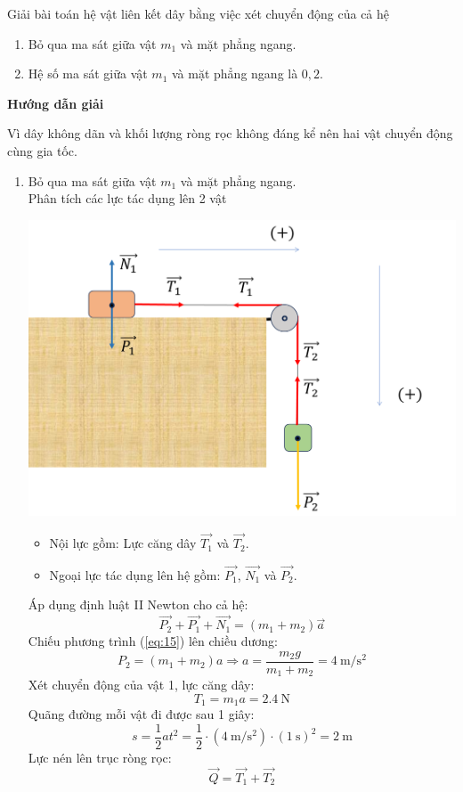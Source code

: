 \begin{dang}{Giải bài toán hệ vật liên kết dây bằng việc xét chuyển động của cả hệ}
{\begin{enumerate}[label=\alph*)]
		\item Bỏ qua ma sát giữa vật $m_1$ và mặt phẳng ngang.
		\item Hệ số ma sát giữa vật $m_1$ và mặt phẳng ngang là $0,2$.
	\end{enumerate}
}
{\begin{center}
		\textbf{Hướng dẫn giải}
	\end{center}
Vì dây không dãn và khối lượng ròng rọc không đáng kể nên hai vật chuyển động cùng gia tốc.
	\begin{enumerate}[label=\alph*)]
		\item Bỏ qua ma sát giữa vật $m_1$ và mặt phẳng ngang.\\
		Phân tích các lực tác dụng lên 2 vật
		\begin{center}
			\includegraphics[width=0.6\linewidth]{../figs/VN10-2023-PH-TP021-2}
		\end{center}
		\begin{itemize}
			\item Nội lực gồm: Lực căng dây $\overrightarrow{T_1}$ và $\overrightarrow{T_2}$.
			\item Ngoại lực tác dụng lên hệ gồm: $\overrightarrow{P_1}$, $\overrightarrow{N_1}$ và $\overrightarrow{P_2}$.
		\end{itemize}
	Áp dụng định luật II Newton cho cả hệ:
	\begin{equation}
		\label{eq:15}
		\overrightarrow{P_2}+\overrightarrow{P_1}+\overrightarrow{N_1}=\left(m_1+m_2\right)\vec{a}
	\end{equation} 
	Chiếu phương trình (\ref{eq:15}) lên chiều dương:
	$$P_2=\left(m_1+m_2\right)a \Rightarrow a=\dfrac{m_2g}{m_1+m_2}=\SI{4}{\meter/\second^2}$$
	Xét chuyển động của vật 1, lực căng dây:
	$$T_1=m_1a=\SI{2.4}{\newton}$$
	Quãng đường mỗi vật đi được sau 1 giây:
	$$s=\dfrac{1}{2}at^2=\dfrac{1}{2}\cdot\left(\SI{4}{\meter/\second^2}\right)\cdot\left(\SI{1}{\second}\right)^2=\SI{2}{\meter}$$
	Lực nén lên trục ròng rọc:
	$$\overrightarrow{Q}=\overrightarrow{T_1}+\overrightarrow{T_2}$$

\end{enumerate}}
\end{dang}
